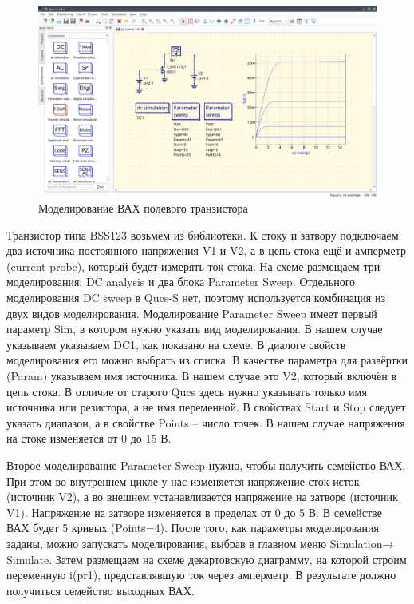 \documentclass[a4paper,12pt]{article}
\begin{document}
    \begin{figure}[!ht]
    \begin{center}
        \includegraphics[width=\textwidth]{img/dc_sweep.png}
    \end{center}
    \caption{Моделирование ВАХ полевого транзистора} \label{fig:dc_sweep}
    \end{figure}

Транзистор типа BSS123 возьмём из библиотеки. К стоку и затвору подключаем два источника постоянного напряжения V1 и V2, а в цепь стока ещё и амперметр (current probe), который будет измерять ток стока. На схеме размещаем три моделирования: DC analysis и два блока Parameter Sweep. Отдельного моделирования DC sweep в Qucs-S нет, поэтому используется комбинация из двух видов моделирования. Моделирование Parameter Sweep имеет первый параметр Sim, в котором нужно указать вид моделирования. В нашем случае указываем указываем DC1, как показано на схеме. В диалоге свойств моделирования его можно выбрать из списка. В качестве параметра для развёртки (Param) указываем имя источника. В нашем случае это V2, который включён в цепь стока. В отличие от старого Qucs здесь нужно указывать только имя источника или резистора, а не имя переменной. В свойствах Start и Stop следует указать диапазон, а в свойстве Points – число точек. В нашем случае напряжения на стоке изменяется от 0 до 15 В. 

Второе моделирование Parameter Sweep нужно, чтобы получить семейство ВАХ. При этом во внутреннем цикле у нас изменяется напряжение сток-исток (источник V2), а во внешнем устанавливается напряжение на затворе (источник V1). Напряжение на затворе изменяется в пределах от 0 до 5 В.  В семействе ВАХ будет 5 кривых (Points=4). После того, как параметры моделирования заданы, можно запускать моделирования, выбрав в главном меню Simulation→ Simulate. Затем размещаем на схеме декартовскую диаграмму, на которой строим переменную i(pr1), представлявшую ток через амперметр. В результате должно получиться семейство выходных ВАХ.
\end{document}
